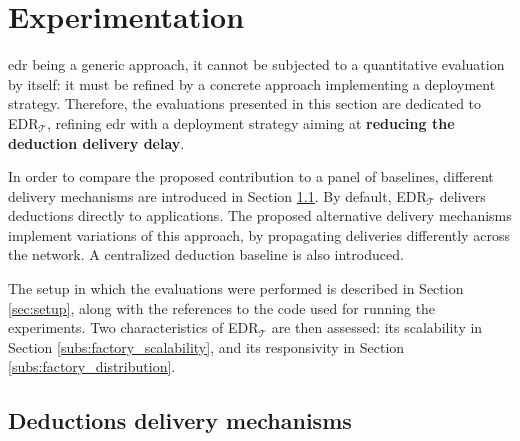 \documentclass{iosart2c}
\newcommand{\edrt}{EDR$_{\mathcal{T}}$\xspace}
\begin{document}
\section{Experimentation}
\label{sec:experimentations}
\gls{edr} being a generic approach, it cannot be subjected to a quantitative evaluation by itself: it must be refined by a concrete approach implementing a deployment strategy. 
Therefore, the evaluations presented in this section are dedicated to \edrt, refining \gls{edr} with a deployment strategy aiming at \textbf{reducing the deduction delivery delay}.

In order to compare the proposed contribution to a panel of baselines, different delivery mechanisms are introduced in Section \textsection \ref{sec:deductions_propagation_strategies}. 
By default, \edrt delivers deductions directly to applications. 
The proposed alternative delivery mechanisms implement variations of this approach, by propagating deliveries differently across the network.
A centralized deduction baseline is also introduced.

The setup in which the evaluations were performed is described in Section \textsection \ref{sec:setup}, along with the references to the code used for running the experiments.
Two characteristics of \edrt are then assessed: its scalability in Section \textsection\ref{subs:factory_scalability}, and its responsivity in Section \textsection\ref{subs:factory_distribution}.

\subsection{Deductions delivery mechanisms}
\label{sec:deductions_propagation_strategies}
\end{document}

